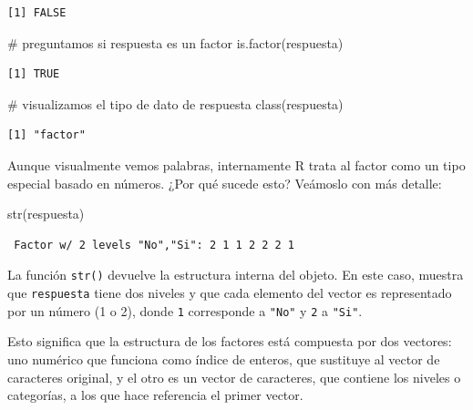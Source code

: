 \documentclass[
  spanish,
  a4paper,
]{scrbook}
\newenvironment{Shaded}{\begin{snugshade}}{\end{snugshade}}
\newcommand{\CommentTok}[1]{\textcolor[rgb]{0.37,0.37,0.37}{#1}}
\newcommand{\FunctionTok}[1]{\textcolor[rgb]{0.28,0.35,0.67}{#1}}
\newcommand{\NormalTok}[1]{\textcolor[rgb]{0.00,0.23,0.31}{#1}}
\begin{document}
\begin{verbatim}
[1] FALSE
\end{verbatim}

\begin{Shaded}
\begin{Highlighting}[]
\CommentTok{\# preguntamos si respuesta es un factor}
\FunctionTok{is.factor}\NormalTok{(respuesta)}
\end{Highlighting}
\end{Shaded}

\begin{verbatim}
[1] TRUE
\end{verbatim}

\begin{Shaded}
\begin{Highlighting}[]
\CommentTok{\# visualizamos el tipo de dato de respuesta}
\FunctionTok{class}\NormalTok{(respuesta)}
\end{Highlighting}
\end{Shaded}

\begin{verbatim}
[1] "factor"
\end{verbatim}

Aunque visualmente vemos palabras, internamente R trata al factor como
un tipo especial basado en números. ¿Por qué sucede esto? Veámoslo con
más detalle:

\begin{Shaded}
\begin{Highlighting}[]
\FunctionTok{str}\NormalTok{(respuesta)}
\end{Highlighting}
\end{Shaded}

\begin{verbatim}
 Factor w/ 2 levels "No","Si": 2 1 1 2 2 2 1
\end{verbatim}

La función \texttt{str()} devuelve la estructura interna del objeto. En
este caso, muestra que \texttt{respuesta} tiene dos niveles y que cada
elemento del vector es representado por un número (1 o 2), donde
\texttt{1} corresponde a \texttt{"No"} y \texttt{2} a \texttt{"Si"}.

Esto significa que la estructura de los factores está compuesta por dos
vectores: uno numérico que funciona como índice de enteros, que
sustituye al vector de caracteres original, y el otro es un vector de
caracteres, que contiene los niveles o categorías, a los que hace
referencia el primer vector.
\end{document}
